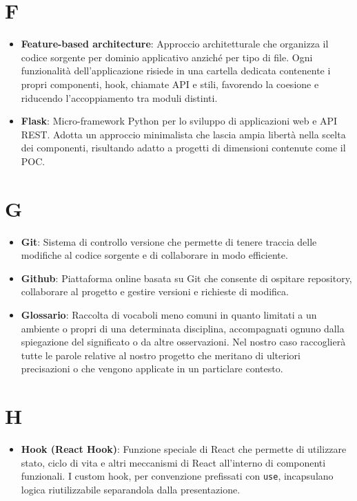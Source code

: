 \documentclass[11pt,a4paper]{article}
\begin{document}
\section*{F}
\begin{itemize}
\item \textbf{Feature-based architecture}: Approccio architetturale che 
organizza il codice sorgente per dominio applicativo anziché per tipo 
di file. Ogni funzionalità dell'applicazione risiede in una cartella 
dedicata contenente i propri componenti, hook, chiamate API e stili, 
favorendo la coesione e riducendo l'accoppiamento tra moduli distinti.

\item \textbf{Flask}: Micro-framework Python per lo sviluppo di 
applicazioni web e API REST. Adotta un approccio minimalista che 
lascia ampia libertà nella scelta dei componenti, risultando 
adatto a progetti di dimensioni contenute come il POC.
\end{itemize}
\newpage

\section*{G}
\begin{itemize}
\item \textbf{Git}: Sistema di controllo versione che permette di tenere traccia delle modifiche al codice sorgente e di collaborare in modo efficiente.

\item \textbf{Github}: Piattaforma online basata su Git che consente di ospitare repository, collaborare al progetto e gestire versioni e richieste di modifica.

\item \textbf{Glossario}: Raccolta di vocaboli meno comuni in quanto limitati a un ambiente o propri di una determinata disciplina, accompagnati ognuno dalla spiegazione del significato o da altre osservazioni. Nel nostro caso raccoglierà tutte le parole relative al nostro progetto che meritano di ulteriori precisazioni o che vengono applicate in un particlare contesto.
\end{itemize}
\newpage

\section*{H}
\begin{itemize}
\item \textbf{Hook (React Hook)}: Funzione speciale di React che 
permette di utilizzare stato, ciclo di vita e altri meccanismi 
di React all'interno di componenti funzionali. I custom hook, 
per convenzione prefissati con \texttt{use}, incapsulano logica 
riutilizzabile separandola dalla presentazione.
\end{itemize}
\newpage
\end{document}
